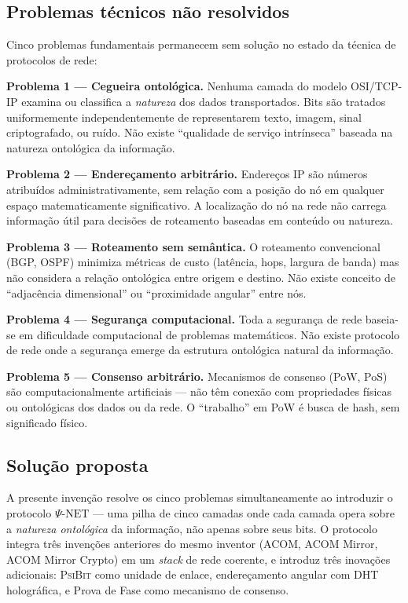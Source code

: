 \documentclass[12pt,a4paper]{article}
\newcommand{\PsiBit}{\textsc{PsiBit}}
\newcommand{\PsiNet}{\Psi\text{-NET}}
\begin{document}
\subsection{Problemas técnicos não resolvidos}

Cinco problemas fundamentais permanecem sem solução no estado da
técnica de protocolos de rede:

\textbf{Problema 1 --- Cegueira ontológica.} Nenhuma camada do
modelo OSI/TCP-IP examina ou classifica a \textit{natureza} dos
dados transportados. Bits são tratados uniformemente
independentemente de representarem texto, imagem, sinal
criptografado, ou ruído. Não existe ``qualidade de serviço
intrínseca'' baseada na natureza ontológica da informação.

\textbf{Problema 2 --- Endereçamento arbitrário.} Endereços IP
são números atribuídos administrativamente, sem relação com a
posição do nó em qualquer espaço matematicamente significativo.
A localização do nó na rede não carrega informação útil para
decisões de roteamento baseadas em conteúdo ou natureza.

\textbf{Problema 3 --- Roteamento sem semântica.} O roteamento
convencional (BGP, OSPF) minimiza métricas de custo (latência,
hops, largura de banda) mas não considera a relação
ontológica entre origem e destino. Não existe conceito de
``adjacência dimensional'' ou ``proximidade angular'' entre nós.

\textbf{Problema 4 --- Segurança computacional.} Toda a
segurança de rede baseia-se em dificuldade computacional de
problemas matemáticos. Não existe protocolo de rede onde a
segurança emerge da estrutura ontológica natural da informação.

\textbf{Problema 5 --- Consenso arbitrário.} Mecanismos de
consenso (PoW, PoS) são computacionalmente artificiais ---
não têm conexão com propriedades físicas ou ontológicas dos
dados ou da rede. O ``trabalho'' em PoW é busca de hash, sem
significado físico.

\subsection{Solução proposta}

A presente invenção resolve os cinco problemas simultaneamente
ao introduzir o protocolo $\PsiNet$ --- uma pilha de cinco
camadas onde cada camada opera sobre a \textit{natureza
ontológica} da informação, não apenas sobre seus bits. O
protocolo integra três invenções anteriores do mesmo inventor
(ACOM, ACOM Mirror, ACOM Mirror Crypto) em um \textit{stack}
de rede coerente, e introduz três inovações adicionais:
\PsiBit{} como unidade de enlace, endereçamento angular com
DHT holográfica, e Prova de Fase como mecanismo de consenso.
\end{document}
